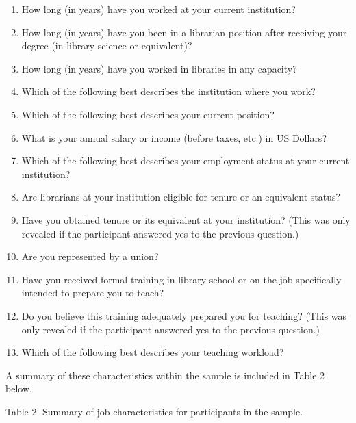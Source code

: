 \documentclass[
  twocolumn]{article}
\providecommand{\tightlist}{%
  \setlength{\itemsep}{0pt}\setlength{\parskip}{0pt}}\usepackage{longtable,booktabs,array}
\begin{document}
\begin{enumerate}
\def\labelenumi{\arabic{enumi}.}
\tightlist
\item
  How long (in years) have you worked at your current institution?
\item
  How long (in years) have you been in a librarian position after
  receiving your degree (in library science or equivalent)?
\item
  How long (in years) have you worked in libraries in any capacity?
\item
  Which of the following best describes the institution where you work?
\item
  Which of the following best describes your current position?
\item
  What is your annual salary or income (before taxes, etc.) in US
  Dollars?
\item
  Which of the following best describes your employment status at your
  current institution?
\item
  Are librarians at your institution eligible for tenure or an
  equivalent status?
\item
  Have you obtained tenure or its equivalent at your institution? (This
  was only revealed if the participant answered yes to the previous
  question.)
\item
  Are you represented by a union?
\item
  Have you received formal training in library school or on the job
  specifically intended to prepare you to teach?
\item
  Do you believe this training adequately prepared you for teaching?
  (This was only revealed if the participant answered yes to the
  previous question.)
\item
  Which of the following best describes your teaching workload?
\end{enumerate}

A summary of these characteristics within the sample is included in
Table 2 below.

Table 2. Summary of job characteristics for participants in the sample.
\end{document}
